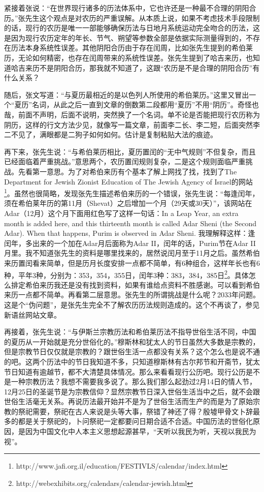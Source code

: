 紧接着张说：“在世界现行诸多的历法体系中，它也许还是一种最不合理的阴阳合历。”张先生这个观点是对农历的严重误解。从本质上说，如果不考虑技术手段限制的话，现行的农历是唯一一部能够确保历法与日地月系统运动完全吻合的历法，这是因为现行农历定年的年长、节气、朔望等参数全部是依据实际测量得到的，不存在历法本身系统性误差。其他阴阳合历由于存在闰周，比如张先生提到的希伯莱历，无论如何精密，也存在闰周带来的系统性误差。张先生提到了哈吉来历，也知道哈吉来历不是阴阳合历，那我就不知道了，这跟“农历是不是合理的阴阳合历”有什么关系？

随后，张文写道：“与夏历最相近的是以色列人所使用的希伯莱历。”这里又冒出一个“夏历”名词，从此之后一直到文章的倒数第二段都用“夏历”不用“阴历”。奇怪也哉，前面不声明，后面不说明，突然换了一个名词。单不论是否能把现行农历称为阴历，这样的行文方法少见，就像写一篇文章，前面李二长、李二短，后面突然李二不见了，满眼都是二狗子如何如何。估计是复制粘贴大法的痕迹。

再下来，张先生说：“与希伯莱历相比，夏历置闰的“无中气规则”不但复杂，而且已经面临着严重挑战。”意思两个，农历置闰规则复杂，二是这个规则面临严重挑战。先看第一意思。为了对希伯来历有个基本了解上网找了找，找到了The Department for Jewish Zionist Education of The Jewish Agency of Israel的网站\footnote{http://www.jafi.org.il/education/FESTIVLS/calendar/index.html}。虽然也很简略，发现张先生描述希伯来历的一个错误，张先生说：“每逢闰年，须在希伯莱年历的第11月（Shevat）之后增加一个月（29天或30天）”，该网站在Adar（12月）这个月下面用红色写了这样一句话：In a Leap Year, an extra month is added here, and this thirteenth month is called Adar Sheni (the Second Adar). When that happens, Purim is observed in Adar Sheni. 我理解释这样：逢闰年，多出来的一个加在Adar月后面称为Adar II，闰年的话，Purim节在Adar II月里。我不知道张先生的资料是哪里找来的，居然说闰月至于11月之后。虽然希伯来历置闰看来简单，但是历月长度安排一点都不简单，有6种组合，这样年长也有6种，平年3种，分别为：353，354，355日，闰年3种：383，384，385日\footnote{http://webexhibits.org/calendars/calendar-jewish.html}。具体怎么排定希伯来历我还是没有找到资料，如果有谁给点资料不胜感谢。可以看到希伯来历一点都不简单。再看第二层意思。张先生的所谓挑战是什么呢？2033年问题。这是个“伪问题”，是张先生完全不了解农历历法规则造成的。这个不再谈了，参见新语丝网站文章。

再接着，张先生说：“与伊斯兰宗教历法和希伯莱历法不指导世俗生活不同，中国的夏历从一开始就是充分世俗化的。”穆斯林和犹太人的节日虽然大多数是宗教的，但是宗教节日仅仅就是宗教的？跟世俗生活一点都没有关系？这个怎么也是说不通的吧。这两个历法中的节日我知道不多，只知道穆斯林有古尔邦节和开斋节，犹太节日知道有逾越节，都不大清楚具体情况。那么来看看现行公历吧。现行公历是不是一种宗教历法？我想不需要我多说了。那么我们那么起劲过2月14日的情人节，12月25日的圣诞节是为宗教信仰？显然宗教节日深入世俗生活当中之后，就不会跟世俗生活毫无关系。再说历法最开始并不是为了世俗生活而生产的而是为了原始宗教的祭祀需要，祭祀在古人来说是头等大事，祭错了神还了得？殷墟甲骨文卜辞最多的都是关于祭祀的，卜问祭祀一定都要问日期合适不合适。中国历法的世俗化原因，是因为中国文化中人本主义思想起源甚早，“天听以我民为听，天视以我民为视”。

